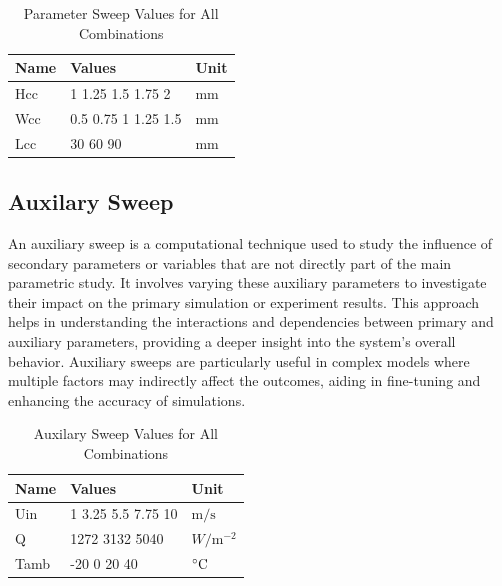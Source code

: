 \documentclass{report}
\begin{document}
            \begin{table}[h]
            \centering
            \begin{tabularx}{\textwidth}{X X X}
            \toprule
            \textbf{Name} & \textbf{Values} & \textbf{Unit} \\ 
            \midrule
            Hcc & 1 1.25 1.5 1.75 2 & \(\text{mm}\) \\ 
            Wcc & 0.5 0.75 1 1.25 1.5 & \(\text{mm}\) \\ 
            Lcc & 30 60 90 & \(\text{mm}\) \\ 
            \bottomrule
            \end{tabularx}
            \caption{Parameter Sweep Values for All Combinations}
            \end{table}
        \subsection{Auxilary Sweep}
            An auxiliary sweep is a computational technique used to study the influence
            of secondary parameters or variables that are not directly part of the main 
            parametric study. It involves varying these auxiliary parameters to 
            investigate their impact on the primary simulation or experiment results. 
            This approach helps in understanding the interactions and dependencies 
            between primary and auxiliary parameters, providing a deeper insight into 
            the system's overall behavior. Auxiliary sweeps are particularly useful in 
            complex models where multiple factors may indirectly affect the outcomes, 
            aiding in fine-tuning and enhancing the accuracy of simulations.

            \begin{table}[h]
            \centering
            \begin{tabularx}{\textwidth}{X X X}
            \toprule
            \textbf{Name} & \textbf{Values} & \textbf{Unit} \\ 
            \midrule
            Uin & 1 3.25 5.5 7.75 10 & \(\text{m}/\text{s}\) \\ 
            Q & 1272 3132 5040 & \(W/\text{m}^{-2}\) \\ 
            Tamb & -20 0 20 40 & \(\degree \text{C}\) \\ 
            \bottomrule
            \end{tabularx}
            \caption{Auxilary Sweep Values for All Combinations}
            \end{table}
        
\end{document}
